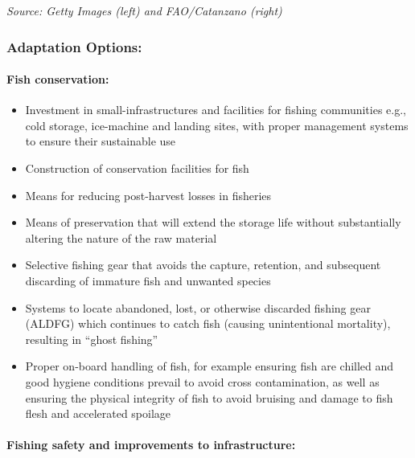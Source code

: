 \documentclass[
]{book}
\providecommand{\tightlist}{%
  \setlength{\itemsep}{0pt}\setlength{\parskip}{0pt}}
\begin{document}
\emph{Source: Getty Images (left) and FAO/Catanzano (right) }

\hypertarget{adaptation-options-1}{%
\subsubsection{\texorpdfstring{\textbf{Adaptation Options:}}{Adaptation Options:}}\label{adaptation-options-1}}

\hypertarget{fish-conservation}{%
\paragraph{Fish conservation:}\label{fish-conservation}}

\begin{itemize}
\tightlist
\item
  Investment in small-infrastructures and facilities for fishing communities e.g., cold storage, ice-machine and landing sites, with proper management systems to ensure their sustainable use
\item
  Construction of conservation facilities for fish
\item
  Means for reducing post-harvest losses in fisheries
\item
  Means of preservation that will extend the storage life without substantially altering the nature of the raw material
\item
  Selective fishing gear that avoids the capture, retention, and subsequent discarding of immature fish and unwanted species
\item
  Systems to locate abandoned, lost, or otherwise discarded fishing gear (ALDFG) which continues to catch fish (causing unintentional mortality), resulting in ``ghost fishing''
\item
  Proper on-board handling of fish, for example ensuring fish are chilled and good hygiene conditions prevail to avoid cross contamination, as well as ensuring the physical integrity of fish to avoid bruising and damage to fish flesh and accelerated spoilage
\end{itemize}

\hypertarget{fishing-safety-and-improvements-to-infrastructure}{%
\paragraph{Fishing safety and improvements to infrastructure:}\label{fishing-safety-and-improvements-to-infrastructure}}
\end{document}
